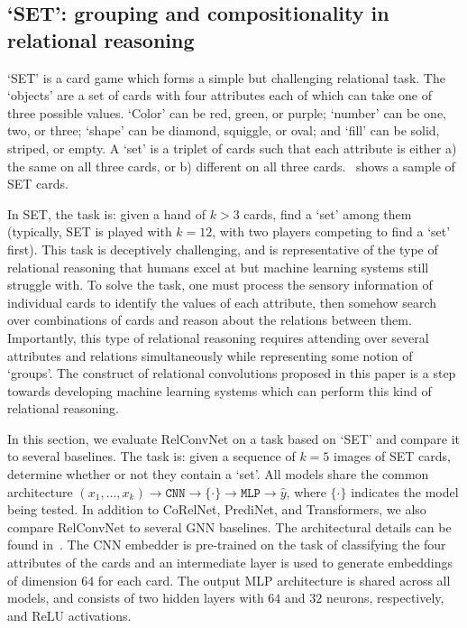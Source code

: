 \subsection{`SET': grouping and compositionality in relational reasoning}\label{ssec:experiments_set}

`SET' is a card game which forms a simple but challenging relational task. The `objects' are a set of cards with four attributes each of which can take one of three possible values. `Color' can be red, green, or purple; `number' can be one, two, or three; `shape' can be diamond, squiggle, or oval; and `fill' can be solid, striped, or empty. A `set' is a triplet of cards such that each attribute is either a) the same on all three cards, or b) different on all three cards.~ shows a sample of SET cards.

In SET, the task is: given a hand of $k > 3$ cards, find a `set' among them (typically, SET is played with $k=12$, with two players competing to find a `set' first). This task is deceptively challenging, and is representative of the type of relational reasoning that humans excel at but machine learning systems still struggle with. To solve the task, one must process the sensory information of individual cards to identify the values of each attribute, then somehow search over combinations of cards and reason about the relations between them. Importantly, this type of relational reasoning requires attending over several attributes and relations simultaneously while representing some notion of `groups'.  The construct of relational convolutions proposed in this paper is a step towards developing machine learning systems which can perform this kind of relational reasoning.


In this section, we evaluate RelConvNet on a task based on `SET' and compare it to several baselines. The task is: given a sequence of $k=5$ images of SET cards, determine whether or not they contain a `set'. All models share the common architecture $(x_1, \ldots, x_k) \to \texttt{CNN} \to \{ \cdot \} \to \texttt{MLP} \to \hat{y}$, where $\{\cdot\}$ indicates the model being tested. In addition to CoRelNet, PrediNet, and Transformers, we also compare RelConvNet to several GNN baselines. The architectural details can be found in~. The CNN embedder is pre-trained on the task of classifying the four attributes of the cards and an intermediate layer is used to generate embeddings of dimension $64$ for each card. The output MLP architecture is shared across all models, and consists of two hidden layers with $64$ and $32$ neurons, respectively, and ReLU activations.


